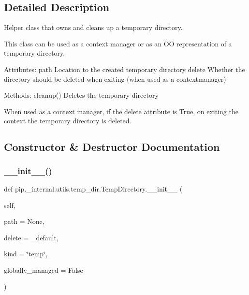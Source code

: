 \subsection{Detailed Description}
\begin{DoxyVerb}Helper class that owns and cleans up a temporary directory.

This class can be used as a context manager or as an OO representation of a
temporary directory.

Attributes:
    path
        Location to the created temporary directory
    delete
        Whether the directory should be deleted when exiting
        (when used as a contextmanager)

Methods:
    cleanup()
        Deletes the temporary directory

When used as a context manager, if the delete attribute is True, on
exiting the context the temporary directory is deleted.
\end{DoxyVerb}
 

\subsection{Constructor \& Destructor Documentation}
\mbox{\label{classpip_1_1__internal_1_1utils_1_1temp__dir_1_1TempDirectory_ab8977ab866889ed4df9d2965c4e9c496}} 
\subsubsection{\texorpdfstring{\+\_\+\+\_\+init\+\_\+\+\_\+()}{\_\_init\_\_()}}
{\footnotesize\ttfamily def pip.\+\_\+internal.\+utils.\+temp\+\_\+dir.\+Temp\+Directory.\+\_\+\+\_\+init\+\_\+\+\_\+ (\begin{DoxyParamCaption}\item[{}]{self,  }\item[{}]{path = {\ttfamily None},  }\item[{}]{delete = {\ttfamily \+\_\+default},  }\item[{}]{kind = {\ttfamily \char`\"{}temp\char`\"{}},  }\item[{}]{globally\+\_\+managed = {\ttfamily False} }\end{DoxyParamCaption})}



